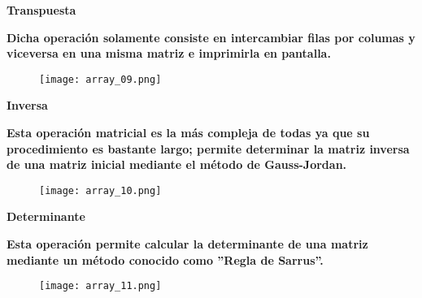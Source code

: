 \documentclass[letterpaper]{article}
\begin{document}
\vspace{-1.0cm}

\begin{center}
\textbf{\LARGE Transpuesta\\}
\vspace{0.5cm}
\end{center}

\begin{flushleft}
\textbf{\Large Dicha operaci\'on solamente consiste en intercambiar filas por columas y viceversa en una misma matriz e imprimirla en pantalla.\\}

\end{flushleft}
\begin{center}
\begin{figure}[H] %
\texttt{[image: array\_09.png]}
\end{figure}
\end{center}

\clearpage

\begin{center}
\textbf{\LARGE Inversa\\}
\vspace{0.5cm}
\end{center}

\begin{flushleft}
\textbf{\Large Esta operaci\'on matricial es la m\'as compleja de todas ya que su procedimiento es bastante largo; permite determinar la matriz inversa de una matriz inicial mediante el m\'etodo de Gauss-Jordan.\\}
\end{flushleft}
\begin{center}
\begin{figure}[H] %
\texttt{[image: array\_10.png]}
\end{figure}
\end{center}

\vspace{-1.0cm}

\begin{center}
\textbf{\LARGE Determinante\\}
\vspace{0.5cm}
\end{center}

\begin{flushleft}
\textbf{\Large Esta operaci\'on permite calcular la determinante de una matriz mediante un m\'etodo conocido como ''Regla de Sarrus''.\\}
\end{flushleft}
\begin{center}
\begin{figure}[H] %
\texttt{[image: array\_11.png]}
\end{figure}
\end{center}
\end{document}

